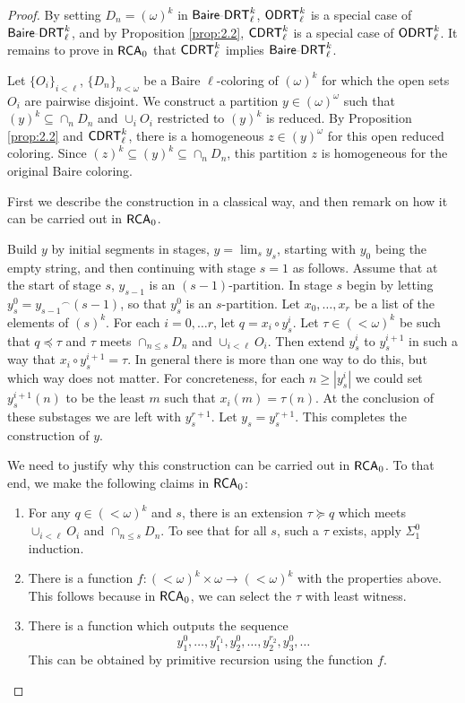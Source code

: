 \documentclass{amsart}
\theoremstyle{definition}
\theoremstyle{remark}
\newcommand{\system}[1]{\mbox{\fontfamily{cmss}\fontshape{n}\fontseries{m}%
    \selectfont#1}}
\newcommand{\RCA}{\system{RCA}\ensuremath{_0}}
\newcommand{\BaDRT}{\system{Baire-DRT}}
\newcommand{\cDRT}{\system{CDRT}}
\newcommand{\ODRT}{\system{ODRT}}
\newcommand{\concat}{^\smallfrown}
\begin{document}
\begin{proof}
By setting $D_n = (\omega)^k$ in $\BaDRT^k_{\ell}$, $\ODRT^k_\ell$ is a special case of $\BaDRT^k_\ell$, and by Proposition \ref{prop:2.2}, $\cDRT^k_\ell$ 
is a special case of $\ODRT^k_\ell$.  It remains to prove in $\RCA$ that $\cDRT^k_\ell$ implies $\BaDRT^k_\ell$. 

Let $\{O_i\}_{i<\ell}$, $\{D_n\}_{n<\omega}$ be a Baire $\ell$-coloring of $(\omega)^k$ for which the open sets $O_i$ are pairwise disjoint. We construct 
a partition $y \in (\omega)^\omega$ such that $(y)^k
\subseteq \cap_n D_n$ and $\cup_i O_i$ restricted to $(y)^k$ is
reduced. By Proposition \ref{prop:2.2} and $\cDRT^k_\ell$, there is a homogeneous 
$z \in (y)^{\omega}$ for this open reduced coloring. Since $(z)^k \subseteq (y)^k \subseteq \cap_n D_n$, this  
partition $z$ is homogeneous for the original Baire coloring. 

First we describe the construction in a classical way, and then remark
on how it can be carried out in $\RCA$.  

Build $y$ by 
initial segments in stages, $y = \lim_s y_s$, starting with $y_{0}$ being the empty string,
and then continuing with stage $s=1$ as follows.  
Assume that at the start of stage $s$, 
$y_{s-1}$ is an $(s-1)$-partition.  In stage $s$ begin by letting $y_s^0 = {y_{s-1}}\concat (s-1)$, so that $y_s^0$ is an $s$-partition.
Let $x_0,\dots, x_r$ be a list of the elements of $(s)^k$.  
For each $i=0,\dots r$,
let $q = x_i \circ y_s^i$.  
Let $\tau \in (<\omega)^k$ be such that $q \preceq \tau$ and $\tau$
meets $\cap_{n\leq s} D_n$ and $\cup_{i<\ell} O_i$. 
Then extend $y_s^i$ to $y_s^{i+1}$ in such a way that 
$x_i \circ y_s^{i+1} =  \tau$.  In general there is more than one way to do this, 
but which way does not matter.  For concreteness, for each $n\geq|y_s^i|$ we could 
set $y_s^{i+1}(n)$ to be the least $m$ such that $x_i(m) = \tau(n)$.
At the conclusion of these substages we are 
left with $y_s^{r+1}$.   Let $y_s = y_s^{r+1}$.  This completes the construction of $y$.

We need to justify why this construction can be carried out in $\RCA$.
To that end, we make the following claims in $\RCA$:
\begin{enumerate}
\item For any $q \in (<\omega)^k$ and $s$, there is 
an extension $\tau \succeq q$ which meets $\cup_{i<\ell} O_i$ 
and $\cap_{n\leq s} D_n$.
To see that for all $s$, such a $\tau$ exists, apply $\Sigma^0_1$ induction.
\item There is a function $f:(<\omega)^k\times \omega\rightarrow (<\omega)^k$ 
with the properties above.
This follows because in $\RCA$, we can select the $\tau$ with least witness.
\item There is a function which outputs the sequence 
$$y_1^0,\dots,y_1^{r_1},y_2^0,\dots,y_2^{r_2},y_3^0,\dots$$
This can be obtained by primitive recursion using the function $f$.
\end{enumerate}


\end{proof}
\end{document}
